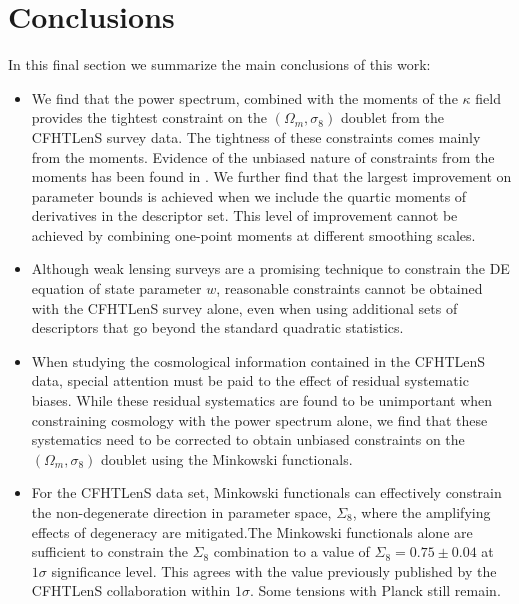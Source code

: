 \documentclass[reprint,aps,prd,superscriptaddress,showkeys,showpacs]{revtex4-1}
\begin{document}

\section{Conclusions}

In this final section we summarize the main conclusions of this work:

\begin{itemize}

\item We find that the power spectrum, combined with the moments of
  the $\kappa$ field provides the tightest constraint on the
  $(\Omega_m,\sigma_8)$ doublet from the CFHTLenS survey data. The
  tightness of these constraints comes mainly from the
  moments. Evidence of the unbiased nature of constraints from the
  moments has been found in \citep{PetriSpurious}. We further find
  that the largest improvement on parameter bounds is achieved when we
  include the quartic moments of derivatives in the descriptor set. This
  level of improvement cannot be achieved by combining one-point
  moments at different smoothing scales.

\item Although weak lensing surveys are a promising technique to
  constrain the DE equation of state parameter $w$, reasonable
  constraints cannot be obtained with the CFHTLenS survey alone, even
  when using additional sets of descriptors that go beyond the
  standard quadratic statistics.

\item When studying the cosmological information contained in the
  CFHTLenS data, special attention must be paid to the effect of
  residual systematic biases. While these residual systematics are
  found to be unimportant when constraining cosmology with the power
  spectrum alone, we find that these systematics need to be corrected
  to obtain unbiased constraints on the $(\Omega_m,\sigma_8)$ doublet
  using the Minkowski functionals.

\item For the CFHTLenS data set, Minkowski functionals can effectively
  constrain the non-degenerate direction in parameter space,
  $\Sigma_8$, where the amplifying effects of degeneracy are
  mitigated.The Minkowski functionals alone are sufficient to
  constrain the $\Sigma_8$ combination to a value of
  $\Sigma_8=0.75\pm0.04$ at $1\sigma$ significance level. This agrees
  with the value previously published by the CFHTLenS collaboration
  within $1\sigma$. Some tensions with Planck \citep{PlanckXVI2013}
  still remain.

\end{itemize}
\end{document}
